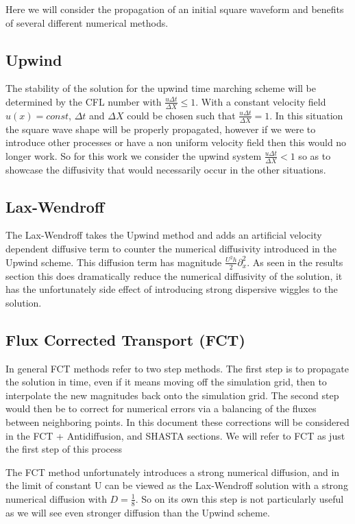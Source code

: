 \documentclass[]{article}
\begin{document}
Here we will consider the propagation of an initial square waveform and benefits of several different numerical methods.

\subsection{Upwind}

The stability of the solution for the upwind time marching scheme will be determined by the CFL number with $\frac{u \Delta t}{\Delta X}\leq 1$. With a constant velocity field $u(x) = const$, $\Delta t$ and $\Delta X$ could be chosen such that $\frac{u \Delta t}{\Delta X} =  1$. In this situation the square wave shape will be properly propagated, however if we were to introduce other processes or have a non uniform velocity field then this would no longer work. So for this work we consider the upwind system $\frac{u \Delta t}{\Delta X} < 1$ so as to showcase the diffusivity that would necessarily occur in the other situations. 
\subsection{Lax-Wendroff}
The Lax-Wendroff takes the Upwind method and adds an artificial  velocity dependent diffusive term to counter the numerical diffusivity introduced in the Upwind scheme. This diffusion term has magnitude $\frac{U^2 h}{2} \partial_x^2$. As seen in the results section this does dramatically reduce the numerical diffusivity of the solution, it has the unfortunately side effect of introducing strong dispersive wiggles to the solution. 
\subsection{Flux Corrected Transport (FCT)}
In general FCT methods refer to two step methods. The first step is to propagate the solution in time, even if it means moving off the simulation grid, then to interpolate the new magnitudes back onto the simulation grid. The second step would then be to correct for numerical errors via a balancing of the fluxes between neighboring points. In this document these corrections will be considered in the FCT + Antidiffusion, and SHASTA sections. We will refer to FCT as just the first step of this process

The FCT method unfortunately introduces a strong numerical diffusion, and in the limit of constant U can be viewed as the Lax-Wendroff solution with a strong numerical diffusion with $D = \frac{1}{8}$. So on its own this step is not particularly useful as we will see even stronger diffusion than the Upwind scheme.
\end{document}
